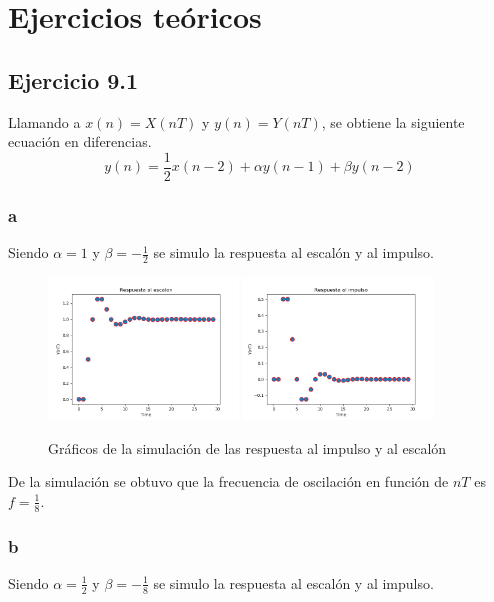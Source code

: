 \documentclass[../../ASSD_TP1_G7.tex]{subfiles}
\begin{document}
\chapter*{Ejercicios te\'oricos}


\section*{Ejercicio 9.1}
Llamando a $x(n)=X(nT)$ y $y(n)=Y(nT)$, se obtiene la siguiente ecuación en diferencias. 
\begin{equation}
y(n)=\frac{1}{2} x(n-2) + \alpha y(n-1) + \beta y(n-2)  
\end{equation}

\subsection*{a}
Siendo $\alpha = 1$ y $\beta = -\frac{1}{2}$ se simulo la respuesta al escalón y al impulso.


\begin{figure}[H]
\centering
{}
{\includegraphics[width=0.45\textwidth]{figures/a-escalon.png}}
{\includegraphics[width=0.45\textwidth]{figures/a-impulso.png}}
\caption{Gráficos de la simulación de las respuesta al impulso y al escalón}\label{f:eja}
\end{figure}



De la simulación se obtuvo que la frecuencia de oscilación en función de $nT$ es $f= \frac{1}{8}$.
\subsection*{b}
Siendo $\alpha = \frac{1}{2}$ y $\beta = -\frac{1}{8}$ se simulo la respuesta al escalón y al impulso.
\end{document}
